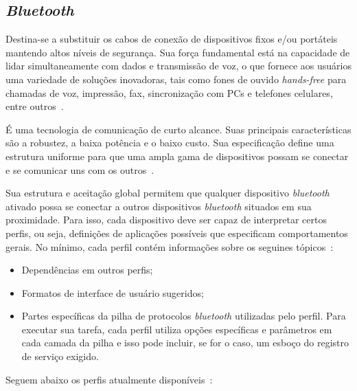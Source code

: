 \subsection{\emph{Bluetooth}}

Destina-se a substituir os cabos de conexão de dispositivos fixos e/ou portáteis mantendo altos níveis de segurança. Sua força fundamental está na capacidade de lidar simultaneamente com dados e transmissão de voz, o que fornece aos usuários uma variedade de soluções inovadoras, tais como fones de ouvido \emph{hands-free} para chamadas de voz, impressão, fax, sincronização com PCs e telefones celulares, entre outros~\cite{bluetoothoverview}.

É uma tecnologia de comunicação de curto alcance. Suas principais características são a robustez, a baixa potência e o baixo custo. Sua especificação define uma estrutura uniforme para que uma ampla gama de dispositivos possam se conectar e se comunicar uns com os outros~\cite{bluetoothoverview}.

Sua estrutura e aceitação global permitem que qualquer dispositivo \emph{bluetooth} ativado possa se conectar a outros dispositivos \emph{bluetooth} situados em sua proximidade. Para isso, cada dispositivo deve ser capaz de interpretar certos perfis, ou seja, definições de aplicações possíveis que especificam comportamentos gerais. No mínimo, cada perfil contém informações sobre os seguines tópicos~\cite{bluetoothprofiles}:

\begin{itemize}
	\item Dependências em outros perfis;
	\item Formatos de interface de usuário sugeridos;
	\item Partes específicas da pilha de protocolos \emph{bluetooth} utilizadas pelo perfil. Para executar sua tarefa, cada perfil utiliza opções específicas e parâmetros em cada camada da pilha e isso pode incluir, se for o caso, um esboço do registro de serviço exigido.
\end{itemize}

Seguem abaixo os perfis atualmente disponíveis~\cite{bluetoothprofiles}:

